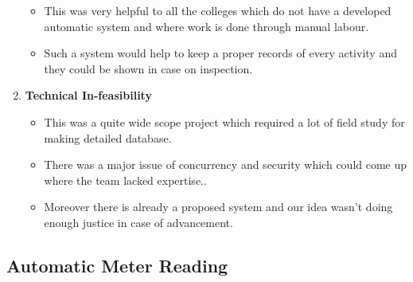 \documentclass[fleqn,10pt]{../SelfArx} %
\begin{document}
\begin{enumerate}
\begin{itemize}
\item This was very helpful to all the colleges which do not have a developed automatic system and where work is done through manual labour.

\item Such a system would help to keep a proper records of every activity and they could be shown in case on inspection.
\end{itemize}

\item \textbf{Technical In-feasibility}
\begin{itemize}

\item
This was a quite wide scope project which required a lot of field study for making detailed database.
\item
There was a major issue of concurrency and security which could come up where the team lacked expertise..
\item
Moreover there is already a proposed system and our idea wasn't doing enough justice in case of advancement.
\end{itemize}
\end{enumerate}

\subsection{Automatic Meter Reading}
\end{document}
